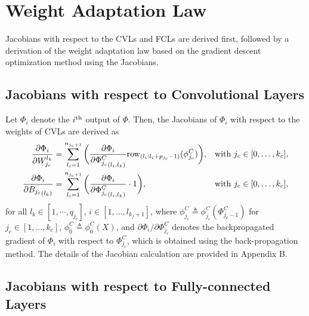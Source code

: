 \documentclass{l4dc2025}
\begin{document}
\section{Weight Adaptation Law}

Jacobians with respect to the CVLs and FCLs are derived first, followed by a derivation of the weight adaptation law based on the gradient descent optimization method using the Jacobians.


\subsection{Jacobians with respect to Convolutional Layers}\label{subsec: Jacobian CNN}

Let $\Phi_i$ denote the $i\textsuperscript{th}$ output of $\Phi$.
Then, the Jacobians of $\Phi_i$ with respect to the weights of CVLs are derived as
\begin{equation}
    \begin{aligned}
        {\partial \Phi_i\over\partial W^{l_k}_{j_c}} 
        &=
        \sum_{l_i=1}^{n_{j_c+1}}
        \bigg(
        {\partial \Phi_i\over\partial {\Phi^C_{j_c}}_{(l_i,l_k)}} 
            \text{row}_{(l_i:l_i+p_{j_c}-1)}(\phi^C_{j_c})
        \bigg)
        ,
         &\text{with }j_c\in[0,\dots,k_c],\hfilneg\\        
        {\partial \Phi_i\over\partial {B_{j_c}}_{(l_k)}} &=
        \sum_{l_i=1}^{n_{j_c+1}} 
        \bigg(
            {\partial \Phi_i\over\partial {\Phi^C_{j_c}}_{(l_i,l_k)}} \cdot 1
        \bigg)
        ,
         &\text{with }j_c\in[0,\dots,k_c],\hfilneg
    \end{aligned}
    \label{eq: Jacobian of CVL}
\end{equation}
for all $l_k\in[1,\cdots,q_{j_c}]$, $i\in[1,\dots,l_{k_f+1}]$, where $\phi^C_{j_c}\triangleq\phi^C_{j_c}(\Phi^C_{j_c-1})$ for $j_c\in[1,\dots,k_c]$, $\phi^C_0 \triangleq \phi^C_0(X)$, and $\partial \Phi_i/\partial \Phi^C_{j_c}$ denotes the backpropagated gradient of $\Phi_i$ with respect to $\Phi^C_{j_c}$, which is obtained using the back-propagation method. The details of the Jacobian calculation are provided in Appendix B.

\subsection{Jacobians with respect to Fully-connected Layers}\label{subsec: Jacobian FCN}
\end{document}
